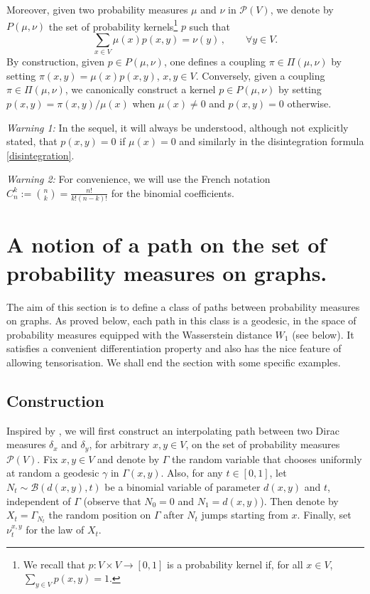 \documentclass[11pt]{amsart}
\numberwithin{equation}{section}
\begin{document}
Moreover, given two probability measures $\mu$ and $\nu$ in $\mathcal{P}(V)$, we denote by $P(\mu,\nu)$ the set of probability kernels\footnote{We recall that $p:V \times V \to [0,1]$ is a probability kernel if, for all 
$x \in V$, $\sum_{y \in V} p(x,y)=1$.}  $p$ such that
$$
\sum_{x \in V} \mu(x)p(x,y) = \nu(y)\,, \qquad \forall y \in V .
$$
By construction, given $p \in P(\mu,\nu)$, one defines a coupling $\pi \in \Pi(\mu,\nu)$ by setting $\pi(x,y)=\mu(x) p(x,y)$, $x,y \in V$.
Conversely, given a coupling $\pi \in \Pi(\mu,\nu)$, we canonically construct a kernel $p \in P(\mu,\nu)$
by setting $p(x,y)=\pi(x,y)/\mu(x)$ when $\mu(x) \neq 0$ and $p(x,y)=0$ otherwise.

{\it Warning 1:} In the sequel, it will always be understood, although not explicitly stated, that $p(x,y)=0$ if $\mu(x)=0$ and similarly in the disintegration formula \eqref{disintegration}.

{\it Warning 2:} For convenience, we will use the French notation $C_n^k := \genfrac{(}{)}{0pt}{}{n}{k} = \frac{n!}{k!(n-k)!}$ for the binomial coefficients. 

\section{A notion of a path on the set of probability measures on graphs.}

The aim of this section is to define a class of paths between probability measures on graphs. As proved below, each path in this class is a geodesic,
in the space of probability measures equipped with the Wasserstein distance $W_1$ (see below). It satisfies a convenient differentiation property and also has the nice feature of allowing tensorisation. 
We shall end the section with some specific examples.

\subsection{Construction}\label{construction}

Inspired by \cite{johnson}, we will first construct an interpolating path between two Dirac measures 
$\delta_x$ and $\delta_y$,  for arbitrary  $x,y \in V$,  on the set of probability measures ${\mathcal P}(V)$. 
Fix $x,y \in V$ and denote by $\Gamma$ the random variable that chooses uniformly at random a geodesic $\gamma$ in $\Gamma(x,y)$. Also, for any $t \in [0,1]$, let $N_t \sim \mathcal{B}(d(x,y),t)$ be a binomial variable of parameter $d(x,y)$ and $t$, independent of $\Gamma$ (observe that $N_0=0$ and $N_1=d(x,y)$). Then denote by $X_t=\Gamma_{N_t}$ the random position on $\Gamma$ after $N_t$ jumps starting from $x$. Finally, set $\nu_t^{x,y}$ for the law of $X_t$.
\end{document}
